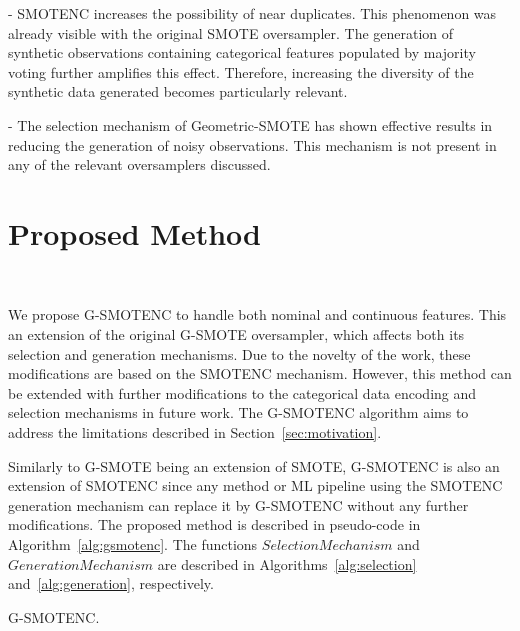 \documentclass[parskip=full]{scrartcl}
\begin{document}
- SMOTENC increases the possibility of near duplicates. This phenomenon was
  already visible with the original SMOTE oversampler. The generation of
  synthetic observations containing categorical features populated by
  majority voting further amplifies this effect. Therefore, increasing the
  diversity of the synthetic data generated becomes particularly relevant.

- The selection mechanism of Geometric-SMOTE has shown effective results in
  reducing the generation of noisy observations. This mechanism is not
  present in any of the relevant oversamplers discussed.


\section{Proposed Method}~\label{sec:proposed_method}

We propose G-SMOTENC to handle both nominal and continuous features.  This an
extension of the original G-SMOTE oversampler, which affects both its
selection and generation mechanisms. Due to the novelty of the work, these
modifications are based on the SMOTENC mechanism. However, this method can be
extended with further modifications to the categorical data encoding and
selection mechanisms in future work. The G-SMOTENC algorithm aims to address
the limitations described in Section~\ref{sec:motivation}.

Similarly to G-SMOTE being an extension of SMOTE, G-SMOTENC is also an
extension of SMOTENC since any method or ML pipeline using the SMOTENC
generation mechanism can replace it by G-SMOTENC without any further
modifications. The proposed method is described in pseudo-code in
Algorithm~\ref{alg:gsmotenc}. The functions $SelectionMechanism$ and
$GenerationMechanism$ are described in Algorithms~\ref{alg:selection}
and~\ref{alg:generation}, respectively.

\begin{algorithm}
    \caption{G-SMOTENC.}\label{alg:gsmotenc}
    \DontPrintSemicolon%
    

\end{algorithm}
\end{document}
